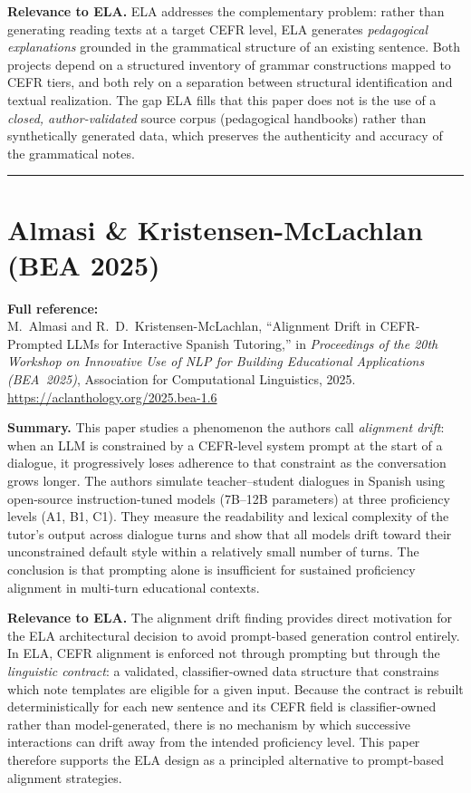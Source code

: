 \documentclass[12pt,a4paper]{article}
\begin{document}
\textbf{Relevance to ELA.}
ELA addresses the complementary problem: rather than generating reading texts at a target CEFR level, ELA generates \emph{pedagogical explanations} grounded in the grammatical structure of an existing sentence. Both projects depend on a structured inventory of grammar constructions mapped to CEFR tiers, and both rely on a separation between structural identification and textual realization. The gap ELA fills that this paper does not is the use of a \emph{closed, author-validated} source corpus (pedagogical handbooks) rather than synthetically generated data, which preserves the authenticity and accuracy of the grammatical notes.

\bigskip
\hrule
\bigskip

\section{Almasi \& Kristensen-McLachlan (BEA 2025)}

\textbf{Full reference:}\\
M.~Almasi and R.~D.~Kristensen-McLachlan, ``Alignment Drift in CEFR-Prompted LLMs for Interactive Spanish Tutoring,'' in \textit{Proceedings of the 20th Workshop on Innovative Use of NLP for Building Educational Applications (BEA~2025)}, Association for Computational Linguistics, 2025.\\
\url{https://aclanthology.org/2025.bea-1.6}

\textbf{Summary.}
This paper studies a phenomenon the authors call \emph{alignment drift}: when an LLM is constrained by a CEFR-level system prompt at the start of a dialogue, it progressively loses adherence to that constraint as the conversation grows longer. The authors simulate teacher--student dialogues in Spanish using open-source instruction-tuned models (7B--12B parameters) at three proficiency levels (A1, B1, C1). They measure the readability and lexical complexity of the tutor's output across dialogue turns and show that all models drift toward their unconstrained default style within a relatively small number of turns. The conclusion is that prompting alone is insufficient for sustained proficiency alignment in multi-turn educational contexts.

\textbf{Relevance to ELA.}
The alignment drift finding provides direct motivation for the ELA architectural decision to avoid prompt-based generation control entirely. In ELA, CEFR alignment is enforced not through prompting but through the \emph{linguistic contract}: a validated, classifier-owned data structure that constrains which note templates are eligible for a given input. Because the contract is rebuilt deterministically for each new sentence and its CEFR field is classifier-owned rather than model-generated, there is no mechanism by which successive interactions can drift away from the intended proficiency level. This paper therefore supports the ELA design as a principled alternative to prompt-based alignment strategies.
\end{document}
